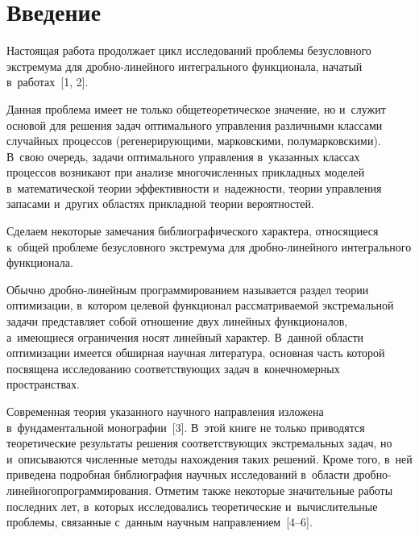  



\thispagestyle{headings}

\begin{multicols}{2}

\label{st\stat}
      
      
\section{Введение}

     Настоящая работа продолжает цикл исследований проб\-ле\-мы 
безусловного экстремума для 
     дроб\-но-ли\-ней\-но\-го интегрального функционала, начатый 
в~работах~[1, 2].
     
     Данная проблема имеет не только общетеорети\-ческое значение, но 
и~служит основой для реше\-ния задач оптимального управ\-ле\-ния различными\linebreak 
классами случайных процессов (регенерирующими, марковскими, 
полумарковскими). В~свою очередь, задачи оптимального управ\-ле\-ния 
в~указанных классах процессов возникают при анализе многочисленных 
при\-клад\-ных моделей в~математической теории эффективности и~на\-деж\-ности, 
тео\-рии управ\-ле\-ния запасами и~других об\-ластях прикладной тео\-рии 
вероятностей.
     
     Сделаем некоторые замечания биб\-лио\-гра\-фи\-че\-ско\-го характера, 
относящиеся к~общей проб\-ле\-ме безусловного экстремума для 
дроб\-но-ли\-ней\-но\-го интегрального функционала.
     
     Обычно дробно-ли\-ней\-ным программированием называется раздел 
тео\-рии оптимизации, в~котором целевой функционал рас\-смат\-ри\-ва\-емой 
экстремальной задачи пред\-став\-ля\-ет собой отношение двух линейных 
функционалов, а~име\-ющи\-еся ограничения носят линейный характер. В~данной 
об\-ласти оптимизации имеется обширная научная литература, основная часть 
которой посвящена исследованию соответствующих задач в~конечномерных 
пространствах.
     
     Современная теория указанного научного на\-прав\-ле\-ния изложена 
в~фундаментальной монографии~[3]. В~этой книге не только приводятся 
теоретические результаты решения со\-от\-вет\-ст\-ву\-ющих экстремальных задач, но 
и~описываются чис\-лен\-ные методы нахождения таких решений. Кроме того, 
в~ней приведена подробная библиография научных исследований в~области 
дроб\-но-ли\-ней\-но\-го\linebreak программирования. Отметим также некоторые\linebreak 
значительные работы по\-след\-них лет, в~которых исследовались теоретические 
и~вы\-чис\-ли\-тель\-ные проб\-ле\-мы, связанные с~данным научным на\-прав\-ле\-ни\-ем~[4--6].
     

\end{multicols}
